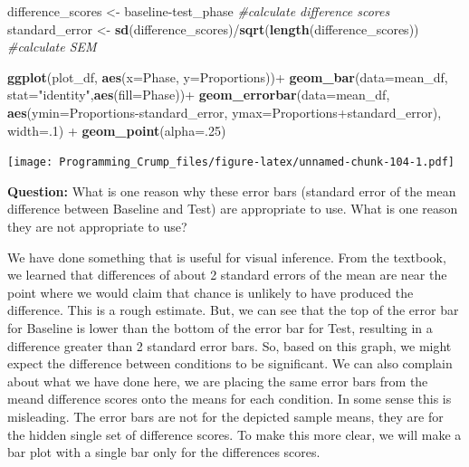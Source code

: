 \documentclass[]{book}
\newenvironment{Shaded}{\begin{snugshade}}{\end{snugshade}}
\newcommand{\KeywordTok}[1]{\textcolor[rgb]{0.13,0.29,0.53}{\textbf{{#1}}}}
\newcommand{\DataTypeTok}[1]{\textcolor[rgb]{0.13,0.29,0.53}{{#1}}}
\newcommand{\DecValTok}[1]{\textcolor[rgb]{0.00,0.00,0.81}{{#1}}}
\newcommand{\StringTok}[1]{\textcolor[rgb]{0.31,0.60,0.02}{{#1}}}
\newcommand{\CommentTok}[1]{\textcolor[rgb]{0.56,0.35,0.01}{\textit{{#1}}}}
\newcommand{\NormalTok}[1]{{#1}}
\theoremstyle{definition}
\theoremstyle{definition}
\theoremstyle{definition}
\theoremstyle{remark}
\begin{document}
\begin{Shaded}
\begin{Highlighting}[]
\NormalTok{difference_scores <-}\StringTok{ }\NormalTok{baseline-test_phase }\CommentTok{#calculate difference scores}
\NormalTok{standard_error <-}\StringTok{ }\KeywordTok{sd}\NormalTok{(difference_scores)/}\KeywordTok{sqrt}\NormalTok{(}\KeywordTok{length}\NormalTok{(difference_scores)) }\CommentTok{#calculate SEM}


\KeywordTok{ggplot}\NormalTok{(plot_df, }\KeywordTok{aes}\NormalTok{(}\DataTypeTok{x=}\NormalTok{Phase, }\DataTypeTok{y=}\NormalTok{Proportions))+}\StringTok{ }
\StringTok{  }\KeywordTok{geom_bar}\NormalTok{(}\DataTypeTok{data=}\NormalTok{mean_df, }\DataTypeTok{stat=}\StringTok{"identity"}\NormalTok{,}\KeywordTok{aes}\NormalTok{(}\DataTypeTok{fill=}\NormalTok{Phase))+}
\StringTok{  }\KeywordTok{geom_errorbar}\NormalTok{(}\DataTypeTok{data=}\NormalTok{mean_df, }\KeywordTok{aes}\NormalTok{(}\DataTypeTok{ymin=}\NormalTok{Proportions-standard_error, }
                                  \DataTypeTok{ymax=}\NormalTok{Proportions+standard_error), }\DataTypeTok{width=}\NormalTok{.}\DecValTok{1}\NormalTok{) +}
\StringTok{  }\KeywordTok{geom_point}\NormalTok{(}\DataTypeTok{alpha=}\NormalTok{.}\DecValTok{25}\NormalTok{)}
\end{Highlighting}
\end{Shaded}

\texttt{[image: Programming\_Crump\_files/figure-latex/unnamed-chunk-104-1.pdf]}

\textbf{Question:} What is one reason why these error bars (standard
error of the mean difference between Baseline and Test) are appropriate
to use. What is one reason they are not appropriate to use?

We have done something that is useful for visual inference. From the
textbook, we learned that differences of about 2 standard errors of the
mean are near the point where we would claim that chance is unlikely to
have produced the difference. This is a rough estimate. But, we can see
that the top of the error bar for Baseline is lower than the bottom of
the error bar for Test, resulting in a difference greater than 2
standard error bars. So, based on this graph, we might expect the
difference between conditions to be significant. We can also complain
about what we have done here, we are placing the same error bars from
the meand difference scores onto the means for each condition. In some
sense this is misleading. The error bars are not for the depicted sample
means, they are for the hidden single set of difference scores. To make
this more clear, we will make a bar plot with a single bar only for the
differences scores.
\end{document}
